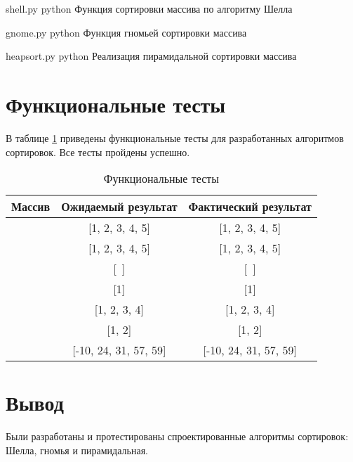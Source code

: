 \clearpage
{}
{shell.py} %
{python} %
{Функция сортировки массива по алгоритму Шелла} %

\clearpage

{gnome.py} %
{python} %
{Функция гномьей сортировки массива} %

\clearpage

{heapsort.py} %
{python} %
{Реализация пирамидальной сортировки массива} %

\clearpage

\section{Функциональные тесты}

В таблице \ref{tbl:func_tests} приведены функциональные тесты для разработанных алгоритмов сортировок. Все тесты пройдены успешно.

\begin{table}[ht]
	\small
	\begin{center}
		\begin{threeparttable}
			\caption{Функциональные тесты}
			\label{tbl:func_tests}
			\begin{tabular}{|c|c|c|}
				\hline
				\bfseries Массив
				& \bfseries Ожидаемый результат
				& \bfseries Фактический результат \\ 
				\hline
				[1, 2, 3, 4, 5] & [1, 2, 3, 4, 5] & [1, 2, 3, 4, 5] \\
				\hline
				[5, 4, 3, 2, 1]  & [1, 2, 3, 4, 5] & [1, 2, 3, 4, 5] \\
				\hline
				[~]  & [~] & [~] \\
				\hline
				[1]  & [1] & [1]\\
				\hline
				[4, 1, 2, 3]  & [1, 2, 3, 4] & [1, 2, 3, 4] \\
				\hline
				[2, 1]  & [1, 2] & [1, 2] \\
				\hline
				[31, 57, 24, -10, 59]  & [-10, 24, 31, 57, 59] & [-10, 24, 31, 57, 59] \\
				\hline
			\end{tabular}	
		\end{threeparttable}	
	\end{center}
\end{table}


\section*{Вывод}
Были разработаны и протестированы спроектированные алгоритмы сортировок:
Шелла, гномья и пирамидальная.